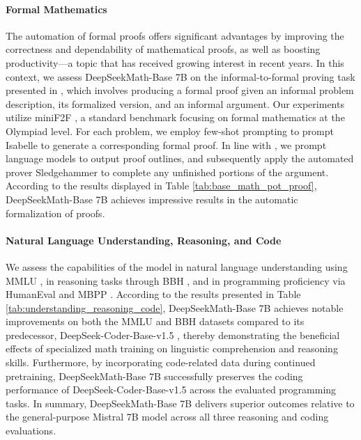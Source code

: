 \begin{itemize}[topsep=0pt]
\paragraph{Formal Mathematics}

The automation of formal proofs offers significant advantages by improving the correctness and dependability of mathematical proofs, as well as boosting productivity—a topic that has received growing interest in recent years. In this context, we assess DeepSeekMath-Base 7B on the informal-to-formal proving task presented in \citep{dsp_proof}, which involves producing a formal proof given an informal problem description, its formalized version, and an informal argument. Our experiments utilize miniF2F \citep{minif2f}, a standard benchmark focusing on formal mathematics at the Olympiad level. For each problem, we employ few-shot prompting to prompt Isabelle to generate a corresponding formal proof. In line with \cite{dsp_proof}, we prompt language models to output proof outlines, and subsequently apply the automated prover Sledgehammer \citep{sledgehammer} to complete any unfinished portions of the argument. According to the results displayed in Table \ref{tab:base_math_pot_proof}, DeepSeekMath-Base 7B achieves impressive results in the automatic formalization of proofs.

\paragraph{Natural Language Understanding, Reasoning, and Code}

We assess the capabilities of the model in natural language understanding using MMLU \citep{mmlu}, in reasoning tasks through BBH \citep{bbh}, and in programming proficiency via HumanEval \citep{codex} and MBPP \citep{mbpp}. According to the results presented in Table \ref{tab:understanding_reasoning_code}, DeepSeekMath-Base 7B achieves notable improvements on both the MMLU and BBH datasets compared to its predecessor, DeepSeek-Coder-Base-v1.5 \citep{deepseek-coder}, thereby demonstrating the beneficial effects of specialized math training on linguistic comprehension and reasoning skills. Furthermore, by incorporating code-related data during continued pretraining, DeepSeekMath-Base 7B successfully preserves the coding performance of DeepSeek-Coder-Base-v1.5 across the evaluated programming tasks. In summary, DeepSeekMath-Base 7B delivers superior outcomes relative to the general-purpose Mistral 7B model \citep{mistral} across all three reasoning and coding evaluations.


\end{itemize}
